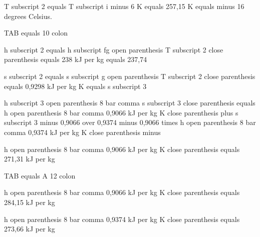T subscript 2 equals T subscript i minus 6 K equals 257,15 K equals minus 16 degrees Celsius.

TAB equals 10 colon

h subscript 2 equals h subscript fg open parenthesis T subscript 2 close parenthesis equals 238 kJ per kg equals 237,74

s subscript 2 equals s subscript g open parenthesis T subscript 2 close parenthesis equals 0,9298 kJ per kg K equals s subscript 3

h subscript 3 open parenthesis 8 bar comma s subscript 3 close parenthesis equals h open parenthesis 8 bar comma 0,9066 kJ per kg K close parenthesis plus s subscript 3 minus 0,9066 over 0,9374 minus 0,9066 times h open parenthesis 8 bar comma 0,9374 kJ per kg K close parenthesis minus

h open parenthesis 8 bar comma 0,9066 kJ per kg K close parenthesis equals 271,31 kJ per kg

TAB equals A 12 colon

h open parenthesis 8 bar comma 0,9066 kJ per kg K close parenthesis equals 284,15 kJ per kg

h open parenthesis 8 bar comma 0,9374 kJ per kg K close parenthesis equals 273,66 kJ per kg